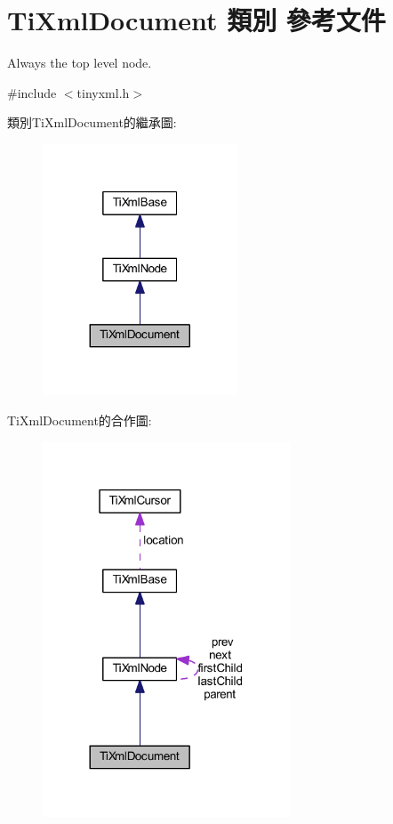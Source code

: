 \hypertarget{class_ti_xml_document}{}\section{Ti\+Xml\+Document 類別 參考文件}
\label{class_ti_xml_document}


Always the top level node.  




{\ttfamily \#include $<$tinyxml.\+h$>$}



類別\+Ti\+Xml\+Document的繼承圖\+:\nopagebreak
\begin{figure}[H]
\begin{center}
\leavevmode
\includegraphics[width=164pt]{class_ti_xml_document__inherit__graph}
\end{center}
\end{figure}


Ti\+Xml\+Document的合作圖\+:\nopagebreak
\begin{figure}[H]
\begin{center}
\leavevmode
\includegraphics[width=209pt]{class_ti_xml_document__coll__graph}
\end{center}
\end{figure}
